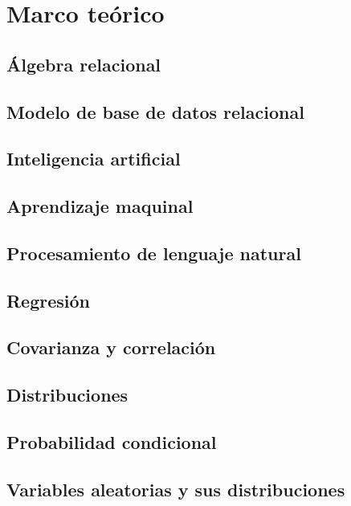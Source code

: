 \documentclass[12pt,letterpaper]{article}
\begin{document}
%
\tableofcontents
\pagebreak
\section {Marco teórico}\label{sec:marcot}
\subsection {Álgebra relacional}\label{subsec:algebra}
\subsection {Modelo de base de datos relacional}\label{subsch:rdb}
\subsection {Inteligencia artificial}\label{subsec:intela}
\subsection {Aprendizaje maquinal}\label{subsec:machinel}
\subsection {Procesamiento de lenguaje natural}\label{subsec:nlp}
\subsection {Regresión}\label{subsec:reg}%
\subsection {Covarianza y correlación}\label{subsec:reg1}
\subsection {Distribuciones}\label{subsec:dist}
\subsection {Probabilidad condicional}\label{subsec:pcond}
\subsection {Variables aleatorias y sus distribuciones}\label{subsec:vayd}
\end{document}
